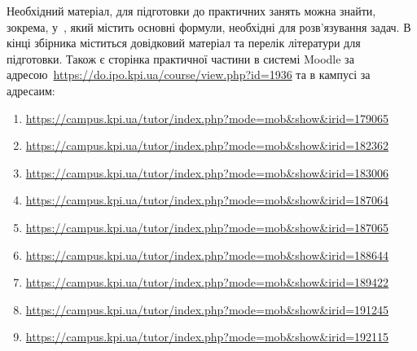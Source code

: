 \documentclass{Syllabus}
\begin{document}
Необхідний матеріал, для підготовки до практичних занять можна знайти, зокрема, у~\cite{ivanova2022optics}, який містить основні формули, необхідні для розв'язування задач. В кінці збірника міститься довідковий матеріал та перелік літератури для підготовки. Також є сторінка практичної частини в системі Moodle за адресою~\url{https://do.ipo.kpi.ua/course/view.php?id=1936} та в кампусі за адресаим:
\begin{enumerate}[label=$\bullet$]
    \item \url{https://campus.kpi.ua/tutor/index.php?mode=mob\&show\&irid=179065}
    \item \url{https://campus.kpi.ua/tutor/index.php?mode=mob\&show\&irid=182362}
    \item \url{https://campus.kpi.ua/tutor/index.php?mode=mob\&show\&irid=183006}
    \item \url{https://campus.kpi.ua/tutor/index.php?mode=mob\&show\&irid=187064}
    \item \url{https://campus.kpi.ua/tutor/index.php?mode=mob\&show\&irid=187065}
    \item \url{https://campus.kpi.ua/tutor/index.php?mode=mob\&show\&irid=188644}
    \item \url{https://campus.kpi.ua/tutor/index.php?mode=mob\&show\&irid=189422}
    \item \url{https://campus.kpi.ua/tutor/index.php?mode=mob\&show\&irid=191245}
    \item \url{https://campus.kpi.ua/tutor/index.php?mode=mob\&show\&irid=192115}
\end{enumerate}
\end{document}
